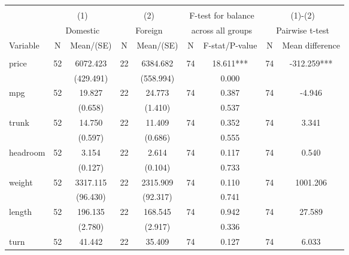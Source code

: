 
\begin{tabular}{@{\extracolsep{5pt}}lcccccccc}
\\[-1.8ex]\hline \hline \\[-1.8ex]
 & \multicolumn{2}{c}{(1)}  & \multicolumn{2}{c}{(2)}  & \multicolumn{2}{c}{F-test for balance} & \multicolumn{2}{c}{(1)-(2)} \\
 & \multicolumn{2}{c}{Domestic}  & \multicolumn{2}{c}{Foreign}  & \multicolumn{2}{c}{across all groups} & \multicolumn{2}{c}{Pairwise t-test}  \\
Variable & N & Mean/(SE) & N & Mean/(SE) & N & F-stat/P-value & N & Mean difference \\ \hline \\[-1.8ex] 
price   & 52    & 6072.423    & 22    & 6384.682    & 74    & 18.611***    & 74    & -312.259***   \\
 &   & (429.491)  &   & (558.994)  &   & 0.000  &   &  \\ [1ex]
mpg   & 52    & 19.827    & 22    & 24.773    & 74    & 0.387    & 74    & -4.946   \\
 &   & (0.658)  &   & (1.410)  &   & 0.537  &   &  \\ [1ex]
trunk   & 52    & 14.750    & 22    & 11.409    & 74    & 0.352    & 74    & 3.341   \\
 &   & (0.597)  &   & (0.686)  &   & 0.555  &   &  \\ [1ex]
headroom   & 52    & 3.154    & 22    & 2.614    & 74    & 0.117    & 74    & 0.540   \\
 &   & (0.127)  &   & (0.104)  &   & 0.733  &   &  \\ [1ex]
weight   & 52    & 3317.115    & 22    & 2315.909    & 74    & 0.110    & 74    & 1001.206   \\
 &   & (96.430)  &   & (92.317)  &   & 0.741  &   &  \\ [1ex]
length   & 52    & 196.135    & 22    & 168.545    & 74    & 0.942    & 74    & 27.589   \\
 &   & (2.780)  &   & (2.917)  &   & 0.336  &   &  \\ [1ex]
turn   & 52    & 41.442    & 22    & 35.409    & 74    & 0.127    & 74    & 6.033   \\

\end{tabular}
